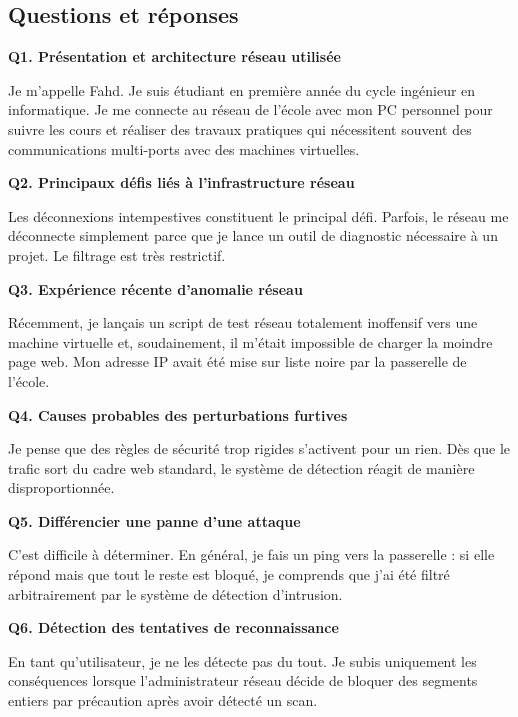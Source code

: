 \documentclass[12pt,a4paper]{article}
\begin{document}
\subsection*{Questions et r\'{e}ponses}

\textbf{Q1. Pr\'{e}sentation et architecture r\'{e}seau utilis\'{e}e}

Je m'appelle Fahd. Je suis \'{e}tudiant en premi\`{e}re ann\'{e}e du cycle ing\'{e}nieur en informatique. Je
me connecte au r\'{e}seau de l'\'{e}cole avec mon PC personnel pour suivre les cours et r\'{e}aliser des
travaux pratiques qui n\'{e}cessitent souvent des communications multi-ports avec des machines
virtuelles.

\bigskip
\textbf{Q2. Principaux d\'{e}fis li\'{e}s \`{a} l'infrastructure r\'{e}seau}

Les d\'{e}connexions intempestives constituent le principal d\'{e}fi. Parfois, le r\'{e}seau me
d\'{e}connecte simplement parce que je lance un outil de diagnostic n\'{e}cessaire \`{a} un projet. Le
filtrage est tr\`{e}s restrictif.

\bigskip
\textbf{Q3. Exp\'{e}rience r\'{e}cente d'anomalie r\'{e}seau}

R\'{e}cemment, je lan\c{c}ais un script de test r\'{e}seau totalement inoffensif vers une machine virtuelle
et, soudainement, il m'\'{e}tait impossible de charger la moindre page web. Mon adresse IP avait
\'{e}t\'{e} mise sur liste noire par la passerelle de l'\'{e}cole.

\bigskip
\textbf{Q4. Causes probables des perturbations furtives}

Je pense que des r\`{e}gles de s\'{e}curit\'{e} trop rigides s'activent pour un rien. D\`{e}s que le trafic sort
du cadre web standard, le syst\`{e}me de d\'{e}tection r\'{e}agit de mani\`{e}re disproportionn\'{e}e.

\bigskip
\textbf{Q5. Diff\'{e}rencier une panne d'une attaque}

C'est difficile \`{a} d\'{e}terminer. En g\'{e}n\'{e}ral, je fais un ping vers la passerelle : si elle r\'{e}pond mais
que tout le reste est bloqu\'{e}, je comprends que j'ai \'{e}t\'{e} filtr\'{e} arbitrairement par le syst\`{e}me de
d\'{e}tection d'intrusion.

\bigskip
\textbf{Q6. D\'{e}tection des tentatives de reconnaissance}

En tant qu'utilisateur, je ne les d\'{e}tecte pas du tout. Je subis uniquement les cons\'{e}quences
lorsque l'administrateur r\'{e}seau d\'{e}cide de bloquer des segments entiers par pr\'{e}caution apr\`{e}s
avoir d\'{e}tect\'{e} un scan.
\end{document}
